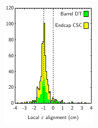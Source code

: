 \documentclass[compress]{beamer}
\begin{document}
\begin{frame}
\begin{columns}
\includegraphics[width=\linewidth]{x_alignments_x}


\end{columns}
\end{frame}
\end{document}
